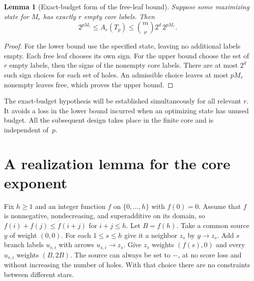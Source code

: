 \documentclass[11pt]{article}
\newtheorem{lemma}[theorem]{Lemma}
\theoremstyle{definition}\newtheorem{example}[theorem]{Example}
\begin{document}
\begin{lemma}[Exact-budget form of the free-leaf bound]\label{lem:envelope}
Suppose some maximizing state for $M_r$ has exactly $r$ empty core labels. Then
\begin{equation}\label{eq:envelope}
  2^{pM_r}\le A_r(T_p)\le \binom{m}{r}2^d\,2^{pM_r}.
\end{equation}
\end{lemma}
\begin{proof}
For the lower bound use the specified state, leaving no additional labels empty. Each free leaf chooses its own sign. For the upper bound choose the set of $r$ empty labels, then the signs of the nonempty core labels. There are at most $2^d$ such sign choices for each set of holes. An admissible choice leaves at most $pM_r$ nonempty leaves free, which proves the upper bound.\end{proof}

The exact-budget hypothesis will be established simultaneously for all relevant $r$. It avoids a loss in the lower bound incurred when an optimizing state has unused budget. All the subsequent design takes place in the finite core and is independent of~$p$.

\section{A realization lemma for the core exponent}
Fix $h\ge1$ and an integer function $f$ on $\{0,\ldots,h\}$ with $f(0)=0$. Assume that $f$ is nonnegative, nondecreasing, and superadditive on its domain, so $f(i)+f(j)\le f(i+j)$ for $i+j\le h$. Let $B=f(h)$. Take a common source $y$ of weight $(0,0)$. For each $1\le s\le h$ give it a neighbor $z_s$ by $y\to z_s$. Add $s$ branch labels $u_{s,i}$ with arrows $u_{s,i}\to z_s$. Give $z_s$ weights $(f(s),0)$ and every $u_{s,i}$ weights $(B,2B)$. The source can always be set to $-$, at no score loss and without increasing the number of holes. With that choice there are no constraints between different stars.
\end{document}
